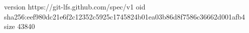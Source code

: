 version https://git-lfs.github.com/spec/v1
oid sha256:eef980dc21e6f2c12352c5925c1745824b01ea03b86d8f7586c36662d001afb4
size 43840
